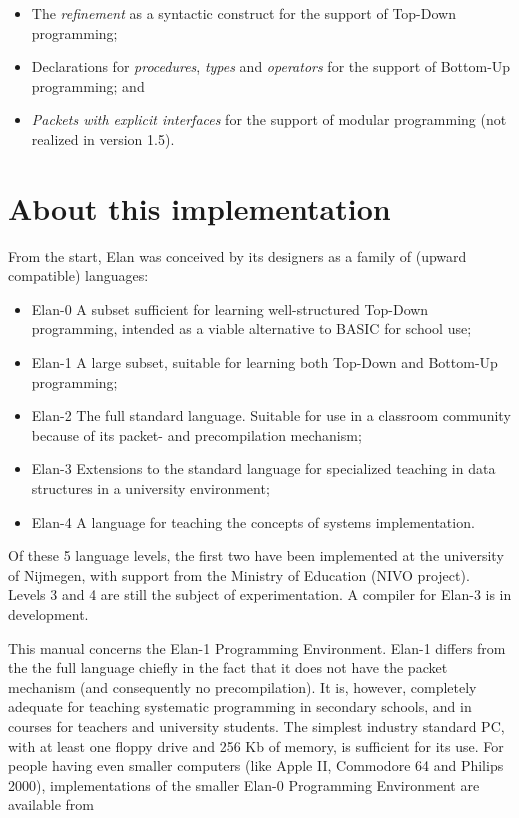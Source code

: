 \begin{itemize}
\item 	The {\em refinement} as a syntactic construct for the
	support of Top-Down programming;
\item 	Declarations for {\em procedures}, {\em types} and {\em operators}
        for the
	support of Bottom-Up programming; and
\item 	{\em Packets with explicit interfaces}
	for the support of modular programming (not realized in version 1.5).
\end{itemize}

\section*{About this implementation}

From the start, Elan was conceived by its designers as a family
of (upward compatible) languages:

\begin{itemize}
\item Elan-0	A subset sufficient for learning well-structured
		Top-Down programming, intended as a viable alternative
		to BASIC for school use;
\item Elan-1	A large subset, suitable for learning both Top-Down
		and Bottom-Up programming;
\item Elan-2	The full standard language. Suitable for use in
		a classroom community because of its packet- and
		precompilation mechanism;
\item Elan-3	Extensions to the standard language for specialized
		teaching in data structures in a university environment;
\item Elan-4	A language for teaching the concepts of systems
		implementation.
\end{itemize}

\noindent
Of these 5 language levels, the first two have been implemented
at the university of Nijmegen, with support from the Ministry
of Education (NIVO project). Levels 3 and 4 are still the subject
of experimentation. A compiler for Elan-3 is in development.

This manual concerns the Elan-1 Programming Environment.
Elan-1 differs from the the full language chiefly in the fact that
it does not have the packet mechanism (and consequently no
precompilation). It is, however, completely adequate for teaching
systematic programming in secondary schools, and in courses for
teachers and university students. The simplest industry standard PC,
with at least one floppy drive and 256 Kb of memory, is sufficient
for its use.
For people having even smaller computers (like Apple II, Commodore 64
and Philips 2000), implementations of the smaller Elan-0 Programming
Environment are available from

